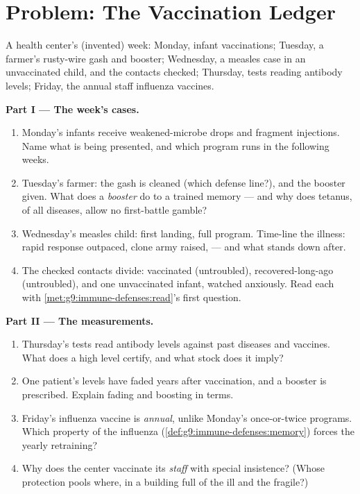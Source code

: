 \section{Problem: The Vaccination Ledger}

\begin{problem}\label{pb:g9:immune-defenses:1}
A health center's (invented) week: Monday, infant
vaccinations; Tuesday, a farmer's rusty-wire gash and
booster; Wednesday, a measles case in an unvaccinated
child, and the contacts checked; Thursday,  tests
reading antibody levels; Friday, the annual staff
influenza vaccines.

\medskip\noindent\textbf{Part I --- The week's cases.}
\begin{enumerate}
  \item Monday's infants receive weakened-microbe drops
        and fragment injections. Name what is being
        presented, and which program runs in the
        following weeks.
  \item Tuesday's farmer: the gash is cleaned (which
        defense line?), and the booster given. What
        does a \emph{booster} do to a trained memory
        --- and why does tetanus, of all diseases, allow
        no first-battle gamble?
  \item Wednesday's measles child: first landing, full
        program. Time-line the illness: rapid response
        outpaced, clone army raised,  --- and
        what stands down after.
  \item The checked contacts divide: vaccinated
        (untroubled), recovered-long-ago (untroubled),
        and one unvaccinated infant, watched anxiously.
        Read each with
        \cref{met:g9:immune-defenses:read}'s first
        question.
\end{enumerate}

\medskip\noindent\textbf{Part II --- The measurements.}
\begin{enumerate}[resume]
  \item Thursday's tests read antibody levels against
        past diseases and vaccines. What does a high
        level certify, and what  stock does it
        imply?
  \item One patient's levels have faded years after
        vaccination, and a booster is prescribed.
        Explain fading and boosting in 
        terms.
  \item Friday's influenza vaccine is \emph{annual},
        unlike Monday's once-or-twice programs. Which
        property of the influenza 
        (\cref{def:g9:immune-defenses:memory}) forces
        the yearly retraining?
  \item Why does the center vaccinate its \emph{staff}
        with special insistence? (Whose protection
        pools where, in a building full of the ill and
        the fragile?)
\end{enumerate}


\end{problem}
